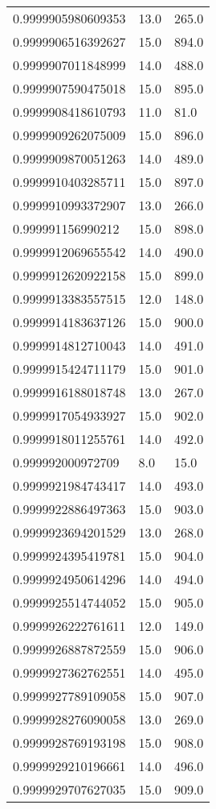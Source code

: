 \begin{center}
\begin{supertabular}[H]{p{0.30\textwidth}p{0.05\textwidth}p{0.05\textwidth}}
0.9999905980609353 & 13.0 & 265.0 \\ 
0.9999906516392627 & 15.0 & 894.0 \\ 
0.9999907011848999 & 14.0 & 488.0 \\ 
0.9999907590475018 & 15.0 & 895.0 \\ 
0.9999908418610793 & 11.0 & 81.0 \\ 
0.9999909262075009 & 15.0 & 896.0 \\ 
0.9999909870051263 & 14.0 & 489.0 \\ 
0.9999910403285711 & 15.0 & 897.0 \\ 
0.9999910993372907 & 13.0 & 266.0 \\ 
0.999991156990212 & 15.0 & 898.0 \\ 
0.9999912069655542 & 14.0 & 490.0 \\ 
0.9999912620922158 & 15.0 & 899.0 \\ 
0.9999913383557515 & 12.0 & 148.0 \\ 
0.9999914183637126 & 15.0 & 900.0 \\ 
0.9999914812710043 & 14.0 & 491.0 \\ 
0.9999915424711179 & 15.0 & 901.0 \\ 
0.9999916188018748 & 13.0 & 267.0 \\ 
0.9999917054933927 & 15.0 & 902.0 \\ 
0.9999918011255761 & 14.0 & 492.0 \\ 
0.999992000972709 & 8.0 & 15.0 \\ 
0.9999921984743417 & 14.0 & 493.0 \\ 
0.9999922886497363 & 15.0 & 903.0 \\ 
0.9999923694201529 & 13.0 & 268.0 \\ 
0.9999924395419781 & 15.0 & 904.0 \\ 
0.9999924950614296 & 14.0 & 494.0 \\ 
0.9999925514744052 & 15.0 & 905.0 \\ 
0.9999926222761611 & 12.0 & 149.0 \\ 
0.9999926887872559 & 15.0 & 906.0 \\ 
0.9999927362762551 & 14.0 & 495.0 \\ 
0.9999927789109058 & 15.0 & 907.0 \\ 
0.9999928276090058 & 13.0 & 269.0 \\ 
0.9999928769193198 & 15.0 & 908.0 \\ 
0.9999929210196661 & 14.0 & 496.0 \\ 
0.9999929707627035 & 15.0 & 909.0 \\ 

\end{supertabular}
\end{center}

